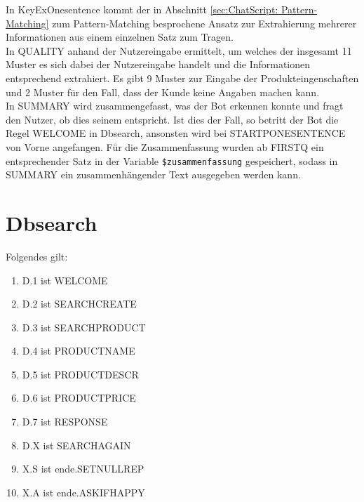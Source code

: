 In KeyExOnesentence kommt der in Abschnitt \ref{sec:ChatScript: Pattern-Matching} zum Pattern-Matching besprochene Ansatz zur Extrahierung mehrerer Informationen aus einem einzelnen Satz zum Tragen.\\
In QUALITY anhand der Nutzereingabe ermittelt, um welches der insgesamt 11 Muster es sich dabei der Nutzereingabe handelt und die Informationen entsprechend extrahiert. Es gibt 9 Muster zur Eingabe der Produkteingenschaften und 2 Muster für den Fall, dass der Kunde keine Angaben machen kann.\\
In SUMMARY wird zusammengefasst, was der Bot erkennen konnte und fragt den Nutzer, ob dies seinem entspricht. Ist dies der Fall, so betritt der Bot die Regel WELCOME in Dbsearch, ansonsten wird bei STARTPONESENTENCE von Vorne angefangen. Für die Zusammenfassung wurden ab FIRSTQ ein entsprechender Satz in der Variable \lstinline|$zusammenfassung| gespeichert, sodass in SUMMARY ein zusammenhängender Text ausgegeben werden kann.

\begin{center}
\end{center}


\section{Dbsearch}
\label{sec:Dbsearch}

Folgendes gilt: 

\begin{enumerate}
\item{D.1 ist WELCOME}
\item{D.2 ist SEARCHCREATE}
\item{D.3 ist SEARCHPRODUCT}
\item{D.4 ist PRODUCTNAME}
\item{D.5 ist PRODUCTDESCR}
\item{D.6 ist PRODUCTPRICE}
\item{D.7 ist RESPONSE}
\item{D.X ist SEARCHAGAIN}
\item{X.S ist \texttildelow ende.SETNULLREP}
\item{X.A ist \texttildelow ende.ASKIFHAPPY}
\end{enumerate}

